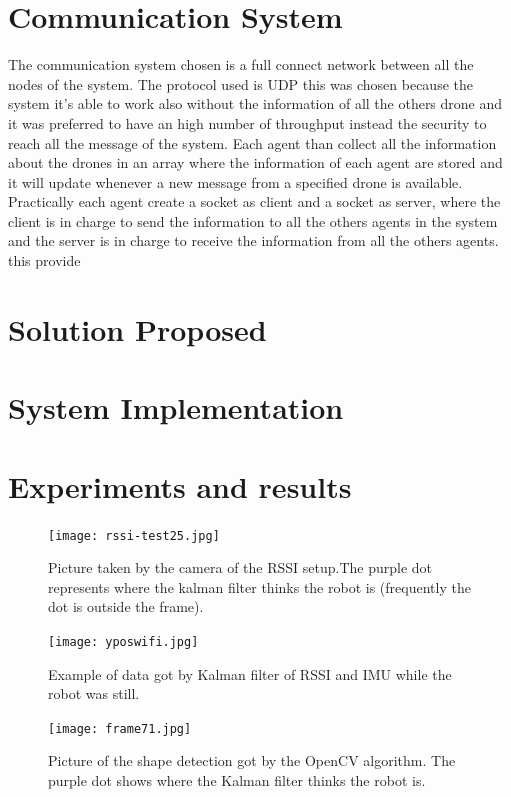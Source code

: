 \documentclass[11pt,twocolumn]{article}
\begin{document}
\section{Communication System}
The communication system chosen is a full connect network between all the nodes of the system. The protocol used is UDP this was chosen because the system it's able to work also without the information of all the others drone and it was preferred to have an high number of throughput instead the security to reach all the message of the system. Each agent than collect all the information about the drones in an array where the information of each agent are stored and it will update whenever a new message from a specified drone is available. Practically each agent create a socket as client and a socket as server, where the client is in charge to send the information to all the others agents in the system and the server is in charge to receive the information from all the others agents. this provide
\section{Solution Proposed}

\section{System Implementation}

\section{Experiments and results}

\newline

\begin{figure}[ht!]
\centering
\texttt{[image: rssi-test25.jpg]}
\caption{Picture taken by the camera of the RSSI setup.The purple dot represents where the kalman filter thinks the robot is (frequently the dot is outside the frame).}
\label{rssi-test25.jpg}
\end{figure}

\begin{figure}[ht!]
\centering
\texttt{[image: yposwifi.jpg]}
\caption{Example of data got by Kalman filter of RSSI and IMU while the robot was still.}
\label{yposwifi.jpg}
\end{figure}

\begin{figure}[ht!]
\centering
\texttt{[image: frame71.jpg]}
\caption{Picture of the shape detection got by the OpenCV algorithm. The purple dot shows where the Kalman filter thinks the robot is.}
\label{frame71.jpg}
\end{figure}
\end{document}
